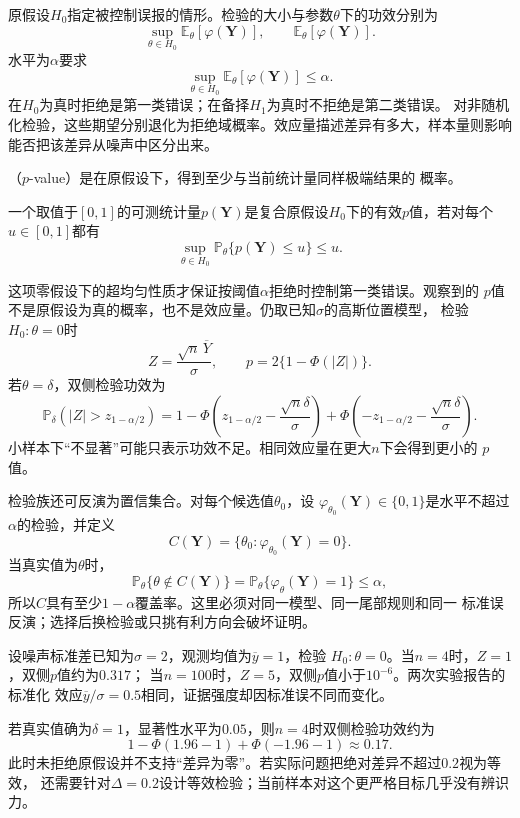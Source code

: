 原假设\(H_0\)指定被控制误报的情形。检验的大小与参数\(\theta\)下的功效分别为
\[
  \sup_{\theta\in H_0}\mathbb{E}_\theta[\varphi(\bm Y)],
  \qquad
  \mathbb{E}_\theta[\varphi(\bm Y)].
\]
水平为\(\alpha\)要求
\[
  \sup_{\theta\in H_0}
  \mathbb{E}_\theta[\varphi(\bm Y)]
  \leq\alpha.
\]
在\(H_0\)为真时拒绝是第一类错误；在备择\(H_1\)为真时不拒绝是第二类错误。
对非随机化检验，这些期望分别退化为拒绝域概率。效应量描述差异有多大，样本量则影响
能否把该差异从噪声中区分出来。

（\(p\)-value）是在原假设下，得到至少与当前统计量同样极端结果的
概率。
\begin{definition}[有效p值]
  \label{def:statistics-valid-p-value}
  一个取值于\([0,1]\)的可测统计量\(p(\bm Y)\)是复合原假设\(H_0\)下的有效\(p\)值，若对每个
\(u\in[0,1]\)都有
\[
  \sup_{\theta\in H_0}\mathbb{P}_\theta\{p(\bm Y)\leq u\}\leq u.
\]
\end{definition}
这项零假设下的超均匀性质才保证按阈值\(\alpha\)拒绝时控制第一类错误。观察到的
\(p\)值不是原假设为真的概率，也不是效应量。仍取已知\(\sigma\)的高斯位置模型，
检验\(H_0:\theta=0\)时
\[
  Z=\frac{\sqrt n\,\overline Y}{\sigma},\qquad
  p=2\{1-\Phi(|Z|)\}.
\]
若\(\theta=\delta\)，双侧检验功效为
\[
  \mathbb{P}_\delta(|Z|>z_{1-\alpha/2})
  =
  1-\Phi\left(z_{1-\alpha/2}-\frac{\sqrt n\delta}{\sigma}\right)
  +\Phi\left(-z_{1-\alpha/2}-\frac{\sqrt n\delta}{\sigma}\right).
\]
小样本下“不显著”可能只表示功效不足。相同效应量在更大\(n\)下会得到更小的
\(p\)值。

检验族还可反演为置信集合。对每个候选值\(\theta_0\)，设
\(\varphi_{\theta_0}(\bm Y)\in\{0,1\}\)是水平不超过\(\alpha\)的检验，并定义
\[
  C(\bm Y)=\{\theta_0:\varphi_{\theta_0}(\bm Y)=0\}.
\]
当真实值为\(\theta\)时，
\[
  \mathbb{P}_\theta\{\theta\notin C(\bm Y)\}
  =\mathbb{P}_\theta\{\varphi_\theta(\bm Y)=1\}\leq\alpha,
\]
所以\(C\)具有至少\(1-\alpha\)覆盖率。这里必须对同一模型、同一尾部规则和同一
标准误反演；选择后换检验或只挑有利方向会破坏证明。

\begin{example}[同一效应量下的证据与功效]
\label{ex:statistics-evidence-power-same-effect}
设噪声标准差已知为\(\sigma=2\)，观测均值为\(\overline y=1\)，检验
\(H_0:\theta=0\)。当\(n=4\)时，\(Z=1\)，双侧\(p\)值约为\(0.317\)；
当\(n=100\)时，\(Z=5\)，双侧\(p\)值小于\(10^{-6}\)。两次实验报告的标准化
效应\(\overline y/\sigma=0.5\)相同，证据强度却因标准误不同而变化。

若真实值确为\(\delta=1\)，显著性水平为\(0.05\)，则\(n=4\)时双侧检验功效约为
\[
  1-\Phi(1.96-1)+\Phi(-1.96-1)\approx0.17.
\]
此时未拒绝原假设并不支持“差异为零”。若实际问题把绝对差异不超过\(0.2\)视为等效，
还需要针对\(\Delta=0.2\)设计等效检验；当前样本对这个更严格目标几乎没有辨识力。
\end{example}

